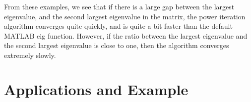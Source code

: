 \documentclass[11pt]{amsart}
\begin{document}
\begin{center}
\end{center}

From these examples, we see that if there is a large gap between the largest eigenvalue, and the second largest eigenvalue in the matrix, the power iteration algorithm converges quite quickly, and is quite a bit faster than the default MATLAB eig function. However, if the ratio between the largest eigenvalue and the second largest eigenvalue is close to one, then the algorithm converges extremely slowly.

\section{Applications and Example}

\end{document}
